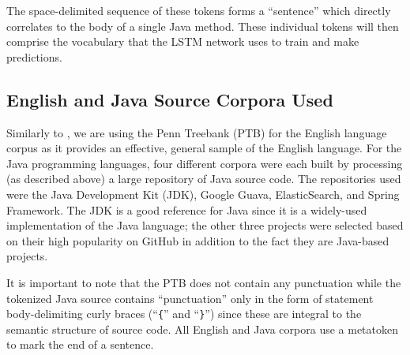 \documentclass[runningheads,a4paper]{llncs}
\begin{document}
The space-delimited sequence of these tokens forms a ``sentence'' which  
directly  correlates to the body of a single Java method. These individual  
tokens will then comprise the vocabulary that the LSTM network uses to train 
and make predictions.
\fi

\subsection{English and Java Source Corpora Used}

Similarly to \citet{LSTMArticle}, we are using the Penn Treebank (PTB) for the
English language corpus as it provides an effective, general sample of the English
language. %
For the Java programming languages, four different corpora were each built
by processing (as described above) a large repository of Java source code. The
repositories used were
the Java Development Kit (JDK), Google Guava, ElasticSearch, and Spring Framework.
The JDK is a good reference for Java since it is a widely-used implementation
of the Java language; the other three projects were selected based on their
high popularity on GitHub in addition to the fact they are
Java-based projects.

It is important to note that the
PTB does not contain any punctuation while the tokenized
Java source contains ``punctuation'' only in the form of statement
body-delimiting curly braces (``\texttt\{'' and ``\texttt\}'')
since these are integral to the semantic structure of source code.
All English and Java corpora use a metatoken to mark the end of a sentence.

\end{document}
